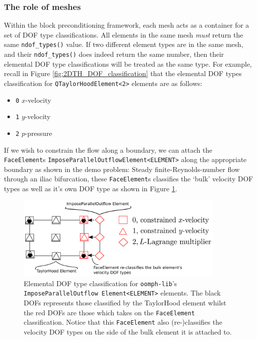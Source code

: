 \subsubsection{The role of meshes}

Within the block preconditioning framework, each mesh acts as a container for 
a set of DOF type classifications. All elements in the same mesh \emph{must} 
return the same \texttt{ndof\_\allowbreak types()} value. If two different 
element types are in the same mesh, and their \texttt{ndof\_\allowbreak types()}
does indeed return the same number, then their elemental DOF type 
classifications will be treated as the same type. For example, recall in 
Figure \ref{fig:2DTH_DOF_classification} that the elemental DOF types 
classification for \texttt{Q\allowbreak TaylorHood\allowbreak Element<2>} 
elements are as follows:
\begin{itemize}
  \item \texttt{0} $x$-velocity
  \item \texttt{1} $y$-velocity
  \item \texttt{2} $p$-pressure
\end{itemize}
If we wish to constrain the flow along a boundary, we can attach the 
\texttt{Face\allowbreak Element}s 
\texttt{Impose\allowbreak Parallel\allowbreak Outflow\allowbreak Element<ELEMENT>} 
along the appropriate boundary as shown in the demo problem: Steady 
finite-Reynolds-number flow through an iliac bifurcation, these 
\texttt{Face\allowbreak Element}s classifies the `bulk' velocity DOF types 
as well as it's own DOF type as shown in Figure 
\ref{fig:2DFACE_DOF_classification}.
\begin{figure}[H]
\centering
\includegraphics[width=0.9\textwidth]{./pic/faceelemenet_dof_classification.pdf}
\caption{Elemental DOF type classification for \texttt{oomph-\allowbreak lib}'s
  \texttt{Impose\allowbreak Parallel\allowbreak Outflow\allowbreak
    Element<ELEMENT>} elements. The black DOFs represents those classified by
  the TaylorHood element whilst the red DOFs are those which takes on the
  \texttt{Face\allowbreak Element} classification. Notice that this
  \texttt{Face\allowbreak Element} also (re-)classifies the velocity DOF types
  on the side of the bulk element it is attached to.}
\label{fig:2DFACE_DOF_classification}
\end{figure}

